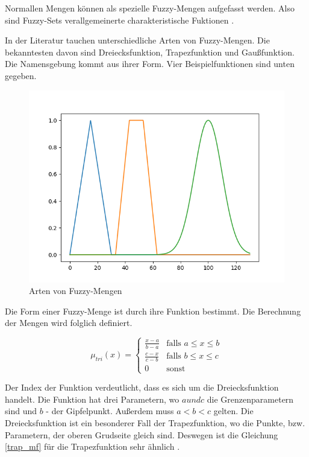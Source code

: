 Normallen Mengen können als spezielle Fuzzy-Mengen aufgefasst werden. Also sind Fuzzy-Sets verallgemeinerte charakteristische Fuktionen \cite{CIKruse:15}.

In der Literatur tauchen unterschiedliche Arten von Fuzzy-Mengen. Die bekanntesten davon sind Dreiecksfunktion, Trapezfunktion und Gaußfunktion. Die Namensgebung kommt aus ihrer Form. Vier Beispielfunktionen sind unten gegeben.

\begin{figure}[htbp]
	\centering
	\includegraphics[scale=0.5]{images/mf_types.png}
	\caption{Arten von Fuzzy-Mengen}\label{mf_types}
\end{figure}

Die Form einer Fuzzy-Menge ist durch ihre Funktion bestimmt. Die Berechnung der Mengen wird folglich definiert.

\begin{equation}
	\mu_{tri}(x) = \begin{cases}
						\frac{x - a}{b - a} & \text{falls $a \leq x \leq b$}\\
						\frac{c - x}{c - b} & \text{falls $b \leq x \leq c$}\\
						0 & \text{sonst}
					\end{cases}
\end{equation}

Der Index der Funktion verdeutlicht, dass es sich um die Dreiecksfunktion handelt. Die Funktion hat drei Parametern, wo $a und c$ die Grenzenparametern sind und $b$ - der Gipfelpunkt. Außerdem muss $a < b < c$ gelten. Die Dreiecksfunktion ist ein besonderer Fall der Trapezfunktion, wo die Punkte, bzw. Parametern, der oberen Grudseite gleich sind. Deswegen ist die Gleichung \ref{trap_mf} für die Trapezfunktion sehr ähnlich \cite{CIKruse:15}.

